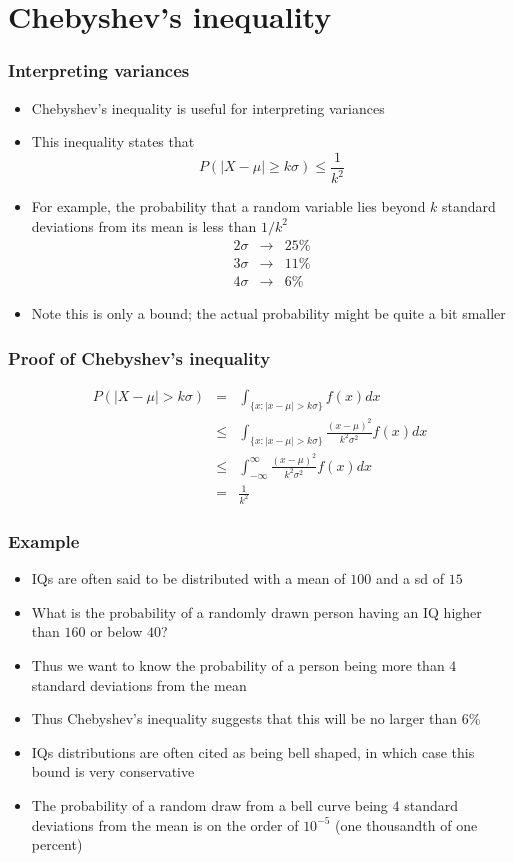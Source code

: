 \documentclass[aspectratio=169]{beamer}
\begin{document}
\section{Chebyshev's inequality}
\begin{frame}
\frametitle{Interpreting variances}
\begin{itemize}
  \item Chebyshev's inequality is useful for interpreting variances
  \item This inequality states that
    $$
    P(|X - \mu| \geq k\sigma) \leq \frac{1}{k^2}
    $$
  \item For example, the probability that a random variable lies beyond $k$
    standard deviations from its mean is less than $1/k^2$
    \begin{eqnarray*}
      2\sigma & \rightarrow & 25\% \\
      3\sigma & \rightarrow & 11\% \\
      4\sigma & \rightarrow &  6\% 
    \end{eqnarray*}
  \item Note this is only a bound; the actual probability might be
    quite a bit smaller
\end{itemize}
\end{frame}

\begin{frame} \frametitle{Proof of Chebyshev's inequality}
  \begin{eqnarray*}
    P(|X - \mu| > k\sigma) & = & \int_{\{x: |x-\mu| > k\sigma\}} f(x) dx \\
& \leq & \int_{\{x:|x -\mu| > k\sigma\}}\frac{(x - \mu)^2}{k^2\sigma^2} f(x) dx \\
& \leq & \int_{-\infty}^{\infty} \frac{(x - \mu)^2}{k^2\sigma^2} f(x) dx \\
& = & \frac{1}{k^2}
  \end{eqnarray*}
\end{frame}

\begin{frame} \frametitle{Example}
  \begin{itemize}
  \item IQs are often said to be distributed with a mean of $100$ and a sd of $15$
  \item What is the probability of a randomly drawn person having an IQ higher than
    $160$ or below $40$?
  \item Thus we want to know the probability of a person being more
    than $4$ standard deviations from the mean
  \item Thus Chebyshev's inequality suggests that this will be no larger than 6\%
  \item IQs distributions are often cited as being bell shaped, in which case this
    bound is very conservative
  \item The probability of a random draw from a bell curve being $4$
    standard deviations from the mean is on the order of $10^{-5}$ (one
    thousandth of one percent)
  \end{itemize}
\end{frame}
\end{document}
